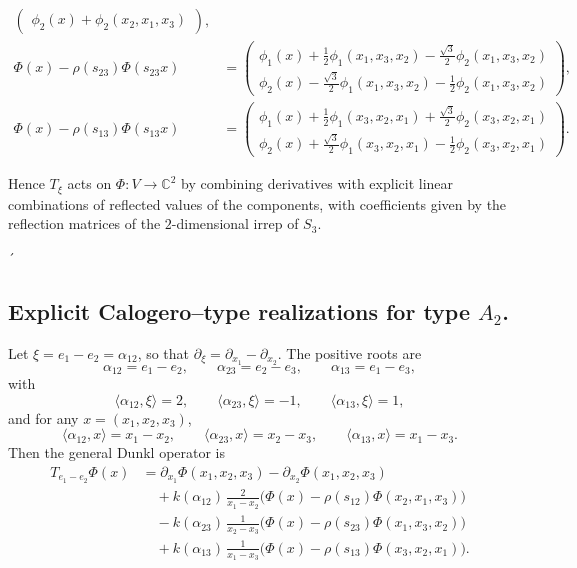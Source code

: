 \documentclass[12pt]{article}
\newcommand{\1}{\mathbbm{1}}
\theoremstyle{definition}
\begin{document}
\begin{itemize}
\[\begin{aligned}
\begin{pmatrix}
\phi_2(x) + \phi_2(x_2,x_1,x_3)
\end{pmatrix}, \\[8pt]
\Phi(x) - \rho(s_{23})\Phi(s_{23}x)
&=
\begin{pmatrix}
\phi_1(x) + \tfrac{1}{2}\phi_1(x_1,x_3,x_2) - \tfrac{\sqrt{3}}{2}\phi_2(x_1,x_3,x_2) \\[6pt]
\phi_2(x) - \tfrac{\sqrt{3}}{2}\phi_1(x_1,x_3,x_2) - \tfrac{1}{2}\phi_2(x_1,x_3,x_2)
\end{pmatrix}, \\[8pt]
\Phi(x) - \rho(s_{13})\Phi(s_{13}x)
&=
\begin{pmatrix}
\phi_1(x) + \tfrac{1}{2}\phi_1(x_3,x_2,x_1) + \tfrac{\sqrt{3}}{2}\phi_2(x_3,x_2,x_1) \\[6pt]
\phi_2(x) + \tfrac{\sqrt{3}}{2}\phi_1(x_3,x_2,x_1) - \tfrac{1}{2}\phi_2(x_3,x_2,x_1)
\end{pmatrix}.
\end{aligned}
\]

Hence $T_\xi$ acts on $\Phi:V\to\mathbb{C}^2$ by combining derivatives with explicit
linear combinations of reflected values of the components, with coefficients given by the
reflection matrices of the $2$-dimensional irrep of $S_3$.
\end{itemize}´

\subsection{Explicit Calogero--type realizations for type $A_2$.}
Let $\xi = e_1 - e_2 = \alpha_{12}$, so that
$\partial_\xi = \partial_{x_1} - \partial_{x_2}$.
The positive roots are
\[
\alpha_{12}=e_1-e_2,\qquad
\alpha_{23}=e_2-e_3,\qquad
\alpha_{13}=e_1-e_3,
\]
with
\[
\langle \alpha_{12},\xi\rangle=2,\qquad
\langle \alpha_{23},\xi\rangle=-1,\qquad
\langle \alpha_{13},\xi\rangle=1,
\]
and for any $x=(x_1,x_2,x_3)$,
\[
\langle \alpha_{12},x\rangle=x_1-x_2,\qquad
\langle \alpha_{23},x\rangle=x_2-x_3,\qquad
\langle \alpha_{13},x\rangle=x_1-x_3.
\]
Then the general Dunkl operator is
\[
\begin{aligned}
T_{e_1-e_2}\Phi(x)
&= \partial_{x_1}\Phi(x_1,x_2,x_3)-\partial_{x_2}\Phi(x_1,x_2,x_3) \\[3pt]
&\quad+ k(\alpha_{12})\,\frac{2}{x_1-x_2}
\big(\Phi(x)-\rho(s_{12})\Phi(x_2,x_1,x_3)\big) \\[3pt]
&\quad- k(\alpha_{23})\,\frac{1}{x_2-x_3}
\big(\Phi(x)-\rho(s_{23})\Phi(x_1,x_3,x_2)\big) \\[3pt]
&\quad+ k(\alpha_{13})\,\frac{1}{x_1-x_3}
\big(\Phi(x)-\rho(s_{13})\Phi(x_3,x_2,x_1)\big).
\end{aligned}
\]
\end{document}
